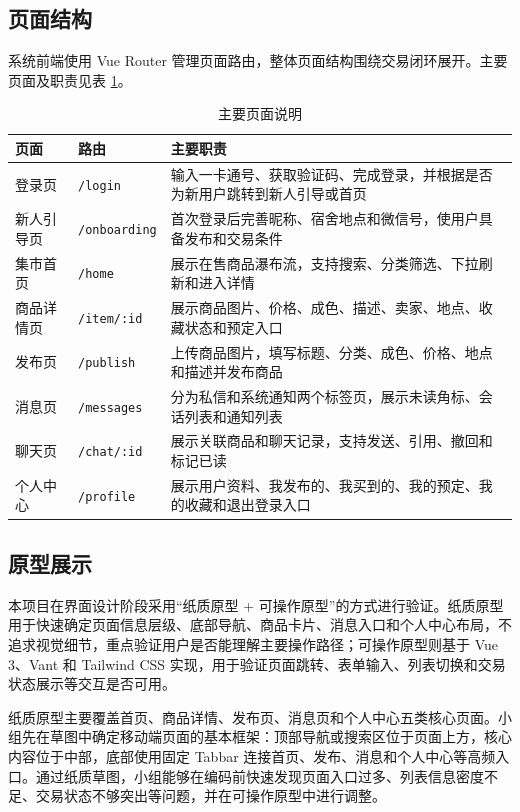 ﻿\documentclass[UTF8,a4paper,12pt]{ctexart}
\begin{document}
\subsection{页面结构}
系统前端使用 Vue Router 管理页面路由，整体页面结构围绕交易闭环展开。主要页面及职责见表 \ref{tab:page-structure}。

\begin{table}[H]
  \centering
  \caption{主要页面说明}
  \label{tab:page-structure}
  \begin{tabular}{p{3cm}p{3cm}p{7.2cm}}
    \toprule
    页面 & 路由 & 主要职责 \\
    \midrule
    登录页 & \texttt{/login} & 输入一卡通号、获取验证码、完成登录，并根据是否为新用户跳转到新人引导或首页 \\
    新人引导页 & \texttt{/onboarding} & 首次登录后完善昵称、宿舍地点和微信号，使用户具备发布和交易条件 \\
    集市首页 & \texttt{/home} & 展示在售商品瀑布流，支持搜索、分类筛选、下拉刷新和进入详情 \\
    商品详情页 & \texttt{/item/:id} & 展示商品图片、价格、成色、描述、卖家、地点、收藏状态和预定入口 \\
    发布页 & \texttt{/publish} & 上传商品图片，填写标题、分类、成色、价格、地点和描述并发布商品 \\
    消息页 & \texttt{/messages} & 分为私信和系统通知两个标签页，展示未读角标、会话列表和通知列表 \\
    聊天页 & \texttt{/chat/:id} & 展示关联商品和聊天记录，支持发送、引用、撤回和标记已读 \\
    个人中心 & \texttt{/profile} & 展示用户资料、我发布的、我买到的、我的预定、我的收藏和退出登录入口 \\
    \bottomrule
  \end{tabular}
\end{table}

\subsection{原型展示}
本项目在界面设计阶段采用“纸质原型 + 可操作原型”的方式进行验证。纸质原型用于快速确定页面信息层级、底部导航、商品卡片、消息入口和个人中心布局，不追求视觉细节，重点验证用户是否能理解主要操作路径；可操作原型则基于 Vue 3、Vant 和 Tailwind CSS 实现，用于验证页面跳转、表单输入、列表切换和交易状态展示等交互是否可用。

纸质原型主要覆盖首页、商品详情、发布页、消息页和个人中心五类核心页面。小组先在草图中确定移动端页面的基本框架：顶部导航或搜索区位于页面上方，核心内容位于中部，底部使用固定 Tabbar 连接首页、发布、消息和个人中心等高频入口。通过纸质草图，小组能够在编码前快速发现页面入口过多、列表信息密度不足、交易状态不够突出等问题，并在可操作原型中进行调整。
\end{document}
